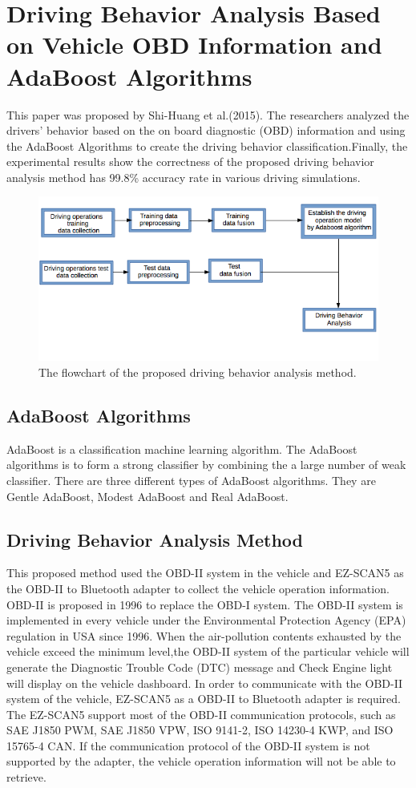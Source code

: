 \section{Driving Behavior Analysis Based on Vehicle OBD Information and AdaBoost Algorithms}
This paper was proposed by Shi-Huang et al.(2015). The researchers analyzed the drivers' behavior based on the on board diagnostic (OBD) information and using the AdaBoost Algorithms to create the driving  behavior classification.Finally, the experimental results show the correctness of the proposed driving behavior analysis method has 99.8\% accuracy rate in various driving simulations.

\begin{figure}[hbt!]\centering
\includegraphics[width=.75\textwidth]{image/adaboost_flowchart}
\caption{The flowchart of the proposed driving behavior analysis method.}
\end{figure}

\subsection{AdaBoost Algorithms}
AdaBoost is a classification machine learning algorithm. The AdaBoost algorithms is to form a strong classifier by combining the a large number of weak classifier. There are three different types of AdaBoost algorithms. They are Gentle AdaBoost, Modest AdaBoost and Real AdaBoost.

\subsection{Driving Behavior Analysis Method}
This proposed method used the OBD-II system in the vehicle and EZ-SCAN5 as the OBD-II to Bluetooth adapter to collect the vehicle operation information. OBD-II is proposed in 1996 to replace the OBD-I system. The OBD-II system is implemented in every vehicle under the Environmental Protection Agency (EPA) regulation in USA since 1996. When the air-pollution contents exhausted by the vehicle exceed the minimum level,the OBD-II system of the particular vehicle will generate the Diagnostic Trouble Code (DTC) message and Check Engine light will display on the vehicle dashboard. In order to communicate with the OBD-II system of the vehicle, EZ-SCAN5 as a OBD-II to Bluetooth adapter is required. The EZ-SCAN5 support most of the OBD-II communication protocols, such as SAE J1850 PWM, SAE J1850 VPW, ISO 9141-2, ISO 14230-4 KWP, and ISO 15765-4 CAN. If the communication protocol of the OBD-II system is not supported by the adapter, the vehicle operation information will not be able to retrieve.

